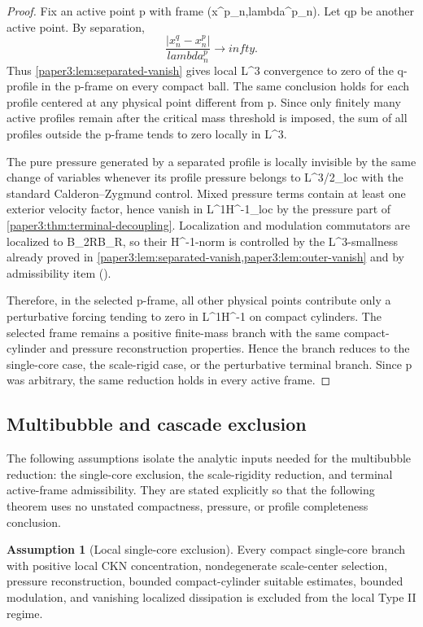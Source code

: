 \documentclass[11pt]{amsart}
\def\({}%
\def\){}%
\def\mathrm#1{#1}%
\def\lambda{lambda}%
\def\infty{infty}%
\theoremstyle{plain}
\theoremstyle{definition}
\newtheorem{assumption}[theorem]{Assumption}
\theoremstyle{remark}
\begin{document}
\begin{proof}
Fix an active point \(p\) with frame \((x^p_n,\lambda^p_n)\).  Let \(q\ne p\)
be another active point.  By separation,
\[
  \frac{|x^q_n-x^p_n|}{\lambda^p_n}\to\infty.
\]
Thus \cref{paper3:lem:separated-vanish} gives local \(L^3\) convergence to zero of the
\(q\)-profile in the \(p\)-frame on every compact ball.  The same conclusion
holds for each profile centered at any physical point different from \(p\).
Since only finitely many active profiles remain after the critical mass
threshold is imposed, the sum of all profiles outside the \(p\)-frame tends to
zero locally in \(L^3\).

The pure pressure generated by a separated profile is locally invisible by the
same change of variables whenever its profile pressure belongs to
\(L^{3/2}_{\mathrm{loc}}\) with the standard Calderon--Zygmund control.  Mixed
pressure terms contain at least one exterior velocity factor, hence vanish in
\(L^1H^{-1}_{\mathrm{loc}}\) by the pressure part of
\cref{paper3:thm:terminal-decoupling}.  Localization and modulation commutators are
localized to \(B_{2R}\setminus B_R\), so their \(H^{-1}\)-norm is controlled by
the \(L^3\)-smallness already proved in \cref{paper3:lem:separated-vanish,paper3:lem:outer-vanish}
and by admissibility item \(()\).

Therefore, in the selected \(p\)-frame, all other physical points contribute
only a perturbative forcing tending to zero in \(L^1H^{-1}\) on compact
cylinders.  The selected frame remains a positive finite-mass branch with the
same compact-cylinder and pressure reconstruction properties.  Hence the branch
reduces to the single-core case, the scale-rigid case, or the perturbative
terminal branch.  Since \(p\) was arbitrary, the same reduction holds in every
active frame.
\end{proof}

\subsection{Multibubble and cascade exclusion}

The following assumptions isolate the analytic inputs needed for the
multibubble reduction: the single-core exclusion, the scale-rigidity reduction,
and terminal active-frame admissibility.  They are stated explicitly so that the
following theorem uses no unstated compactness, pressure, or profile completeness
conclusion.

\begin{assumption}[Local single-core exclusion]\label{paper3:ass:single-core}
Every compact single-core branch with positive local CKN concentration,
nondegenerate scale-center selection, pressure reconstruction, bounded
compact-cylinder suitable estimates, bounded modulation, and vanishing localized
dissipation is excluded from the local Type II regime.
\end{assumption}
\end{document}
